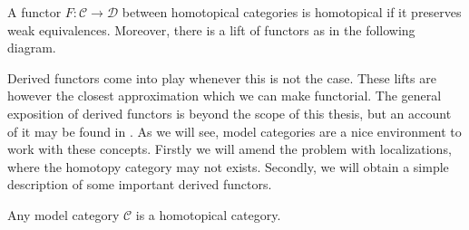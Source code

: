 \documentclass[../thesis.tex]{subfiles}
\begin{document}
            \begin{definition}
                A functor $F:\mathcal{C}\rightarrow \mathcal{D}$ between homotopical categories is homotopical if it preserves weak equivalences. Moreover, there is a lift of functors as in the following diagram.

                \begin{center}
                \end{center}
            \end{definition}

            Derived functors come into play whenever this is not the case. These lifts are however the closest approximation which we can make functorial. The general exposition of derived functors is beyond the scope of this thesis, but an account of it may be found in \cite{Riehl16}. As we will see, model categories are a nice environment to work with these concepts. Firstly we will amend the problem with localizations, where the homotopy category may not exists. Secondly, we will obtain a simple description of some important derived functors.

            \begin{proposition}
                Any model category $\mathcal{C}$ is a homotopical category.
            \end{proposition}
\end{document}
